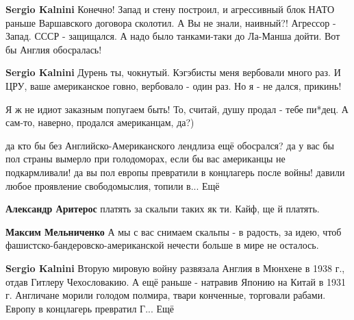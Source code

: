 \begin{itemize}
\begin{itemize}

\textbf{Sergio Kalnini} Конечно! Запад и стену построил, и агрессивный блок НАТО раньше Варшавского договора сколотил. А Вы не знали, наивный?!
Агрессор - Запад. СССР - защищался. А надо было танками-таки до Ла-Манша дойти. Вот бы Англия обосралась!


\textbf{Sergio Kalnini} Дурень ты, чокнутый.
Кэгэбисты меня вербовали много раз. И ЦРУ, ваше американское говно, вербовало - один раз.
Но я - не дался, прикинь!


Я ж не идиот заказным попугаем быть!
То, считай, душу продал - тебе пи*дец.
А сам-то, наверно, продался американцам, да?)


да кто бы без Английско-Американского лендлиза ещё обосрался? да у вас бы пол страны вымерло при голодоморах, если бы вас американцы не подкармливали! да вы пол европы превратили в концлагерь после войны! давили любое проявление свободомыслия, топили в... Ещё


\textbf{Александр Аритерос} платять за скальпи таких як ти. Кайф, ще й платять.


\textbf{Максим Мельниченко} А мы с вас снимаем скальпы - в радость, за идею, чтоб фашистско-бандеровско-американской нечести больше в мире не осталось.


\textbf{Sergio Kalnini} Вторую мировую войну развязала Англия в Мюнхене в 1938 г., отдав Гитлеру Чехословакию. А ещё раньше - натравив Японию на Китай в 1931 г.
Англичане морили голодом полмира, твари конченные, торговали рабами.
Европу в концлагерь превратил Г... Ещё


\end{itemize}
\end{itemize}
